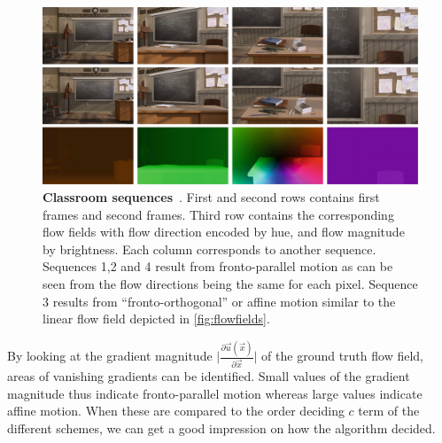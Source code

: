 \documentclass[journal]{vgtc}
\newcommand{\der}{\partial}
\newcommand{\deriv}[2]{\frac{\der #1}{\der #2}}
\newcommand{\flow}{\vec{u}}
\newcommand{\x}{\vec{x}}
\begin{document}
\begin{figure}[htb]
\centering
\includegraphics[width=0.9\linewidth]{images/classroom.png}
\caption{\textbf{Classroom sequences}~\cite{daspaper}. 
First and second rows contains first frames and second frames.
Third row contains the corresponding flow fields with flow direction encoded by hue, and flow magnitude by brightness.
Each column corresponds to another sequence.
Sequences 1,2 and 4 result from fronto-parallel motion as can be seen from the flow directions being the same for each pixel.
Sequence 3 results from \enquote{fronto-orthogonal} or affine motion similar to the linear flow field depicted in \cref{fig:flowfields}.}
\label{fig:classroom}
\end{figure}

By looking at the gradient magnitude $\big|\deriv{\flow(\x)}{\x}\big|$ of the ground truth flow field, areas of vanishing gradients can be identified.
Small values of the gradient magnitude thus indicate fronto-parallel motion whereas large values indicate affine motion.
When these are compared to the order deciding $c$ term of the different schemes, we can get a good impression on how the algorithm decided.
\end{document}
